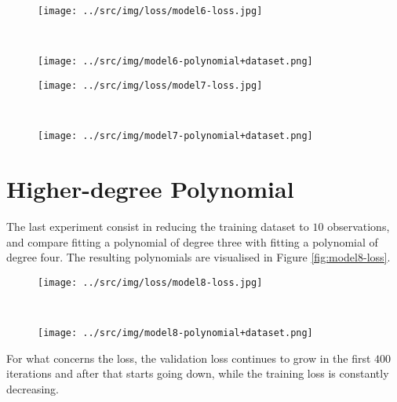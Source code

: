 \documentclass[a4paper,12pt]{article} %
\begin{document}
	\begin{figure}[H]
		\begin{minipage}[t]{.5\textwidth}
			\centering
			\texttt{[image: ../src/img/loss/model6-loss.jpg]}
			\label{fig:model6-loss}
		\end{minipage}
		~
		\begin{minipage}[t]{.5\textwidth}
			\centering
			\texttt{[image: ../src/img/model6-polynomial+dataset.png]}
			\label{fig:model6-polynomial+dataset}
		\end{minipage}
	\end{figure}
	
	\begin{figure}[H]
		\begin{minipage}[t]{.5\textwidth}
			\centering
			\texttt{[image: ../src/img/loss/model7-loss.jpg]}
			\label{fig:model7-loss}
		\end{minipage}
		~
		\begin{minipage}[t]{.5\textwidth}
			\centering
			\texttt{[image: ../src/img/model7-polynomial+dataset.png]}
			\label{fig:model7-polynomial+dataset}
		\end{minipage}
	\end{figure}
	
	
	\section{Higher-degree Polynomial}
	The last experiment consist in reducing the training dataset to $10$ 
	observations, and compare fitting a polynomial of degree three with fitting 
	a polynomial of degree four.
	The resulting polynomials are visualised in Figure 
	\ref*{fig:model8-loss}.
	
	\begin{figure}[H]
		\begin{minipage}[t]{.5\textwidth}
			\centering
			\texttt{[image: ../src/img/loss/model8-loss.jpg]}
			\label{fig:model8-loss}
		\end{minipage}
		~
		\begin{minipage}[t]{.5\textwidth}
			\centering
			\texttt{[image: ../src/img/model8-polynomial+dataset.png]}
			\label{fig:model8-polynomial+dataset}
		\end{minipage}
	\end{figure}
	For what concerns the loss, the validation loss continues to grow in the 
	first $400$ iterations and after that starts going down, while the 
	training loss is constantly decreasing.
	
\end{document}
